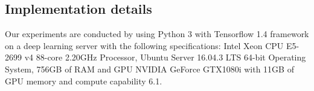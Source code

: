 \documentclass[conference]{IEEEtran}
\begin{document}

\subsection{Implementation details}
Our experiments are conducted by using Python 3 with Tensorflow 1.4 framework on
a deep learning server with the following specifications: Intel Xeon CPU E5-2699
v4 88-core 2.20GHz Processor, Ubuntu Server 16.04.3 LTS 64-bit Operating System,
756GB of RAM and GPU NVIDIA GeForce GTX1080i with 11GB of GPU memory and compute
capability 6.1.
\end{document}
